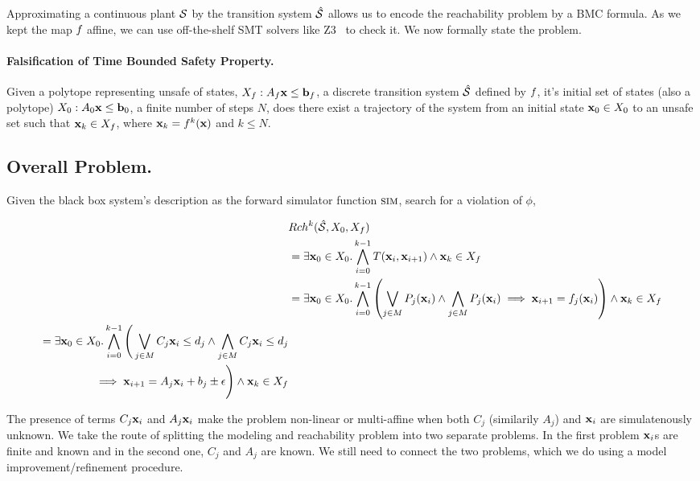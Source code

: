 Approximating a continuous plant $\mathcal{S}$ by the transition
system $\hat{\mathcal{S}}$ allows us to encode the reachability problem by a
BMC formula. As we kept the map $f_{}$ affine, we can use
off-the-shelf SMT solvers like Z3~\cite{DeMoura+Bjorner/08/Z3} to
check it. We now formally state the problem.

\paragraph{Falsification of Time Bounded Safety Property.} Given a
polytope representing unsafe of states, $X_f: A_f\mathbf{x} \le \mathbf{b}_f$, a
discrete transition system $\hat{\mathcal{S}}$ defined by $f_{}$, it's
initial set of states (also a polytope) $X_0: A_0\mathbf{x} \le \mathbf{b}_0$, a
finite number of steps $N$, does there exist a trajectory of the
system from an initial state $\mathbf{x}_0 \in X_0$ to an unsafe set such
that $\mathbf{x}_k \in X_f$, where $\mathbf{x}_k = f_{}^k(\mathbf{x})$ and $k \le N$.

\subsection{Overall Problem.}
Given the black box system's description as the forward simulator
function $\mbox{\sc sim}$, search for a violation of $\phi$,
\begin{scriptsize}
\begin{alignat*}{1}
    &Rch^k(\hat{\mathcal{S}}, X_0, X_f)\\
    &=\exists \mathbf{x}_0 \in X_0.\displaystyle\bigwedge_{i=0}^{k-1}T(\mathbf{x}_i, \mathbf{x}_{i+1}) \land \mathbf{x}_{k} \in X_f\\
    &=\exists \mathbf{x}_0 \in X_0.
    \displaystyle\bigwedge_{i=0}^{k-1}
    \left(\displaystyle\bigvee_{j \in M}P_j(\mathbf{x}_i) \land
        \displaystyle\bigwedge_{j \in M}P_j(\mathbf{x}_i) \implies \mathbf{x}_{i+1} =
    f_{j}(\mathbf{x}_i)\right) \land \mathbf{x}_{k} \in X_f\\
\begin{split}
    =\exists \mathbf{x}_0 \in X_0.\displaystyle\bigwedge_{i=0}^{k-1} \Bigg(\displaystyle\bigvee_{j \in M}C_j\mathbf{x}_i\le d_j \land \displaystyle\bigwedge_{j \in M}C_j\mathbf{x}_i\le d_j\\
    \implies \mathbf{x}_{i+1} = A_j\mathbf{x}_i + b_j \pm \epsilon \Bigg) \land \mathbf{x}_{k} \in X_f
\end{split}
\end{alignat*}
\end{scriptsize}
The presence of terms $C_j\mathbf{x}_i$ and $A_j\mathbf{x}_i$ make the problem
non-linear or multi-affine when both $C_j$ (similarily $A_j$) and
$\mathbf{x}_i$ are simulatenously unknown. We take the route of splitting the
modeling and reachability problem into two separate problems. In the
first problem $\mathbf{x}_i$s are finite and known and in the second one,
$C_j$ and $A_j$ are known. We still need to connect the two problems,
which we do using a model improvement/refinement procedure.


